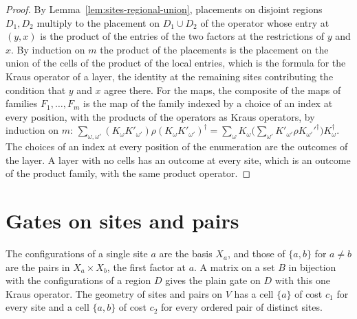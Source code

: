 \begin{proof}\leanok
    By Lemma~\ref{lem:sites-regional-union}, placements on disjoint regions $D_1,D_2$
    multiply to the placement on $D_1\cup D_2$ of the operator whose entry at $(y,x)$
    is the product of the entries of the two factors at the restrictions of $y$ and
    $x$. By induction on $m$ the product of the placements is the placement on the
    union of the cells of the product of the local entries, which is the formula for
    the Kraus operator of a layer, the identity at the remaining sites contributing
    the condition that $y$ and $x$ agree there. For the maps, the composite of the
    maps of families $F_1,\dots,F_m$ is the map of the family indexed by a choice of
    an index at every position, with the products of the operators as Kraus
    operators, by induction on $m$:
    $\sum_{\omega,\omega'}(K_\omega K'_{\omega'})\rho(K_\omega K'_{\omega'})^\dagger
    =\sum_\omega K_\omega\bigl(\sum_{\omega'}K'_{\omega'}\rho K_{\omega'}'^\dagger\bigr)
    K_\omega^\dagger$. The choices of an index at every position of the enumeration are
    the outcomes of the layer. A layer with no cells has an outcome at every site, which is
    an outcome of the product family, with the same product operator.
\end{proof}

\section{Gates on sites and pairs}
\label{sec:circuits_local_gates}

\begin{definition}
    \label{def:circuits_local_gate}
    \leanok
    The configurations of a single site $a$ are the basis $X_a$, and those of
    $\{a,b\}$ for $a\neq b$ are the pairs in $X_a\times X_b$, the first factor at
    $a$. A matrix on a set $B$ in bijection with the configurations of a region $D$
    gives the plain gate on $D$ with this one Kraus operator. The geometry of sites
    and pairs on $V$ has a cell $\{a\}$ of cost $c_1$ for every site and a cell
    $\{a,b\}$ of cost $c_2$ for every ordered pair of distinct sites.
\end{definition}

